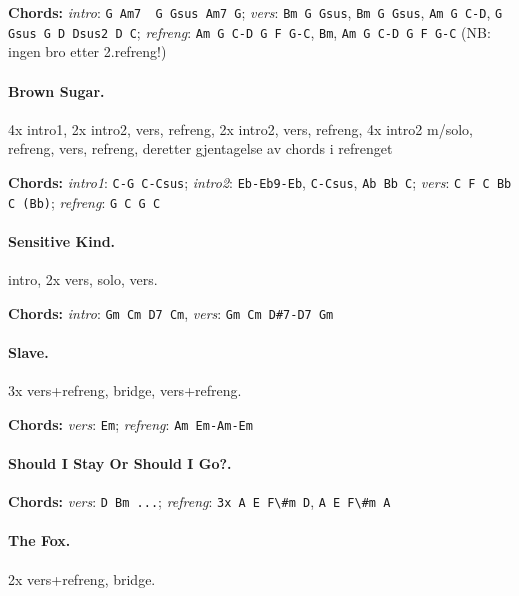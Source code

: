\documentclass[%
twoside,                 %
final,                   %
10pt]{article}
\begin{document}
\textbf{Chords:} \emph{intro}: \Verb!G Am7  G Gsus Am7 G!;
\emph{vers}: \Verb!Bm G Gsus!, \Verb!Bm G Gsus!, \Verb!Am G C-D!, \Verb!G Gsus G D Dsus2 D C!;
\emph{refreng}: \Verb!Am G C-D G F G-C!, \Verb!Bm!, \Verb!Am G C-D G F G-C!
(NB: ingen bro etter 2.refreng!)





\paragraph{Brown Sugar.}
4x intro1, 2x intro2, vers, refreng, 2x intro2, vers, refreng, 4x intro2 m/solo, refreng, vers, refreng, deretter gjentagelse av chords i refrenget

\textbf{Chords:} \emph{intro1}: \Verb!C-G C-Csus!; \emph{intro2}: \Verb!Eb-Eb9-Eb!, \Verb!C-Csus!, \Verb!Ab Bb C!;
\emph{vers}: \Verb!C F C Bb C (Bb)!; \emph{refreng}: \Verb!G C G C!




\paragraph{Sensitive Kind.}
intro, 2x vers, solo, vers.

\textbf{Chords:} \emph{intro}: \Verb!Gm Cm D7 Cm!, \emph{vers}: \Verb!Gm Cm D#7-D7 Gm!





\paragraph{Slave.}
3x vers+refreng, bridge, vers+refreng.

\textbf{Chords:} \emph{vers}: \Verb!Em!; \emph{refreng}: \Verb!Am Em-Am-Em!




\paragraph{Should I Stay Or Should I Go?.}
\textbf{Chords:} \emph{vers}: \Verb!D Bm ...!; \emph{refreng}: \Verb!3x A E F\#m D!, \Verb!A E F\#m A!





\paragraph{The Fox.}
2x vers+refreng, bridge.
\end{document}
